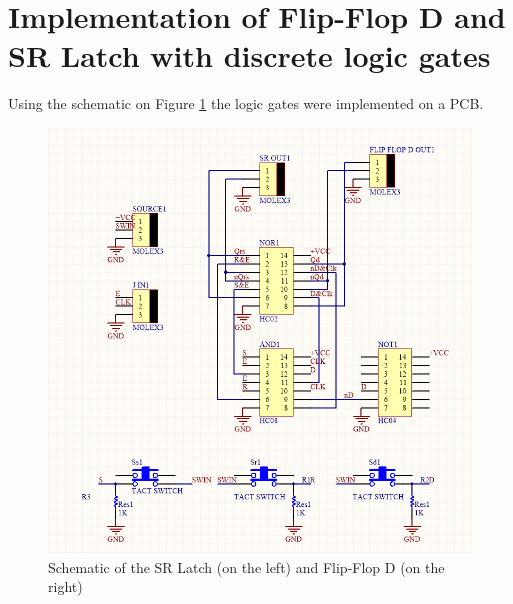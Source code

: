 \documentclass{article}
\begin{document}
        \section{Implementation of Flip-Flop D and SR Latch with discrete logic gates}
        Using the schematic on Figure \ref{fig:Schem} the logic gates were implemented on a PCB.
        \begin{figure}[h]
            \begin{center}
                \includegraphics[width=\linewidth]{e6Schem.png}
                \caption{Schematic of the  SR Latch (on the left) and Flip-Flop D (on the right)}
            \end{center}
            \label{fig:Schem}
        \end{figure}
    
\end{document}

